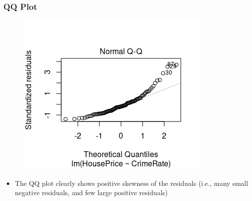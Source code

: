 \documentclass[compress]{beamer}
\begin{document}
\begin{frame}
\frametitle{\sc  QQ Plot}
\vspace{-.2in}
    \begin{figure}[!ht]
		\centering
		\includegraphics[scale=0.7]{figs8/QQ-new.png}
	\end{figure}
	\vspace{-.1in}
\begin{itemize}
\item {\small The QQ plot clearly shows positive skewness of the residuals (i.e., many small negative residuals, and few large positive residuals)}
\end{itemize}
\end{frame}
\end{document}

